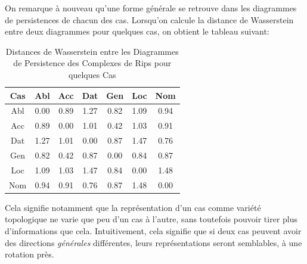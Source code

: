 \documentclass{cours}
\begin{document}
On remarque à nouveau qu'une forme générale se retrouve dans les diagrammes de persistences de chacun des cas.
Lorsqu'on calcule la distance de Wasserstein entre deux diagrammes pour quelques cas, on obtient le tableau suivant:

\begin{table}[H]
\centering
\begin{tabular}{c|cccccc}
	\toprule
	Cas & Abl & Acc & Dat & Gen & Loc & Nom\\
	\midrule
	Abl & 0.00 & 0.89 & 1.27 & 0.82 & 1.09 & 0.94\\
	Acc & 0.89 & 0.00 & 1.01 & 0.42 & 1.03 & 0.91\\
	Dat & 1.27 & 1.01 & 0.00 & 0.87 & 1.47 & 0.76\\
	Gen & 0.82 & 0.42 & 0.87 & 0.00 & 0.84 & 0.87\\
	Loc & 1.09 & 1.03 & 1.47 & 0.84 & 0.00 & 1.48\\
	Nom & 0.94 & 0.91 & 0.76 & 0.87 & 1.48 & 0.00\\
	\bottomrule
\end{tabular}
\caption{Distances de Wasserstein entre les Diagrammes de Persistence des Complexes de Rips pour quelques Cas}
\end{table}

Cela signifie notamment que la représentation d'un cas comme variété topologique ne varie que peu d'un cas à l'autre, sans toutefois pouvoir tirer plus d'informations que cela.
Intuitivement, cela signifie que si deux cas peuvent avoir des directions \textit{générales} différentes, leurs représentations seront semblables, à une rotation près.
\end{document}
